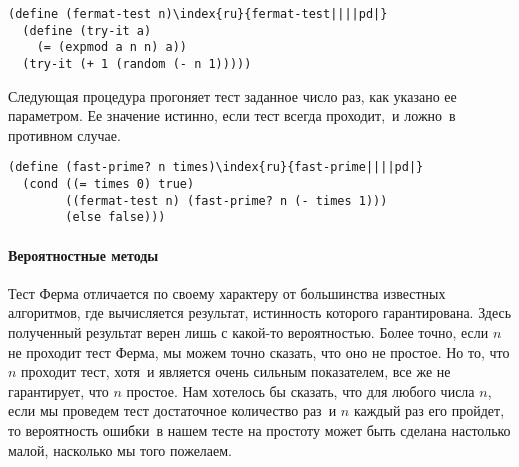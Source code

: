 \begin{Verbatim}[fontsize=\small]
(define (fermat-test n)\index{ru}{fermat-test||||pd|}
  (define (try-it a)
    (= (expmod a n n) a))
  (try-it (+ 1 (random (- n 1)))))
\end{Verbatim}

Следующая процедура прогоняет тест заданное число раз,
как указано ее параметром.  Ее значение истинно, если тест всегда
проходит,~и ложно~в противном случае.

\begin{Verbatim}[fontsize=\small]
(define (fast-prime? n times)\index{ru}{fast-prime||||pd|}
  (cond ((= times 0) true)
        ((fermat-test n) (fast-prime? n (- times 1)))
        (else false)))
\end{Verbatim}

\paragraph{Вероятностные методы}


Тест Ферма отличается по своему
характеру от большинства
известных алгоритмов, где вычисляется результат, истинность
которого гарантирована.  Здесь полученный результат верен лишь с
какой-то вероятностью.  Более точно, если $n$ не проходит
тест Ферма, мы можем точно сказать, что оно не простое.  Но то, что
$n$ проходит тест, хотя~и является очень сильным
показателем, все же не гарантирует, что $n$ простое.  Нам
хотелось бы сказать, что для любого числа $n$, если мы
проведем тест достаточное количество раз~и $n$ каждый раз
его пройдет, то вероятность ошибки~в нашем тесте на простоту может
быть сделана настолько малой, насколько мы того пожелаем.

